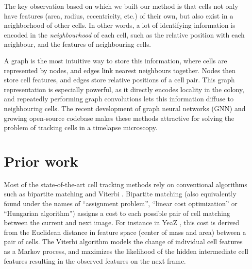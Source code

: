 \documentclass[10pt,conference,compsocconf,a4paper]{IEEEtran}
\begin{document}
	The key observation based on which we built our method is that cells not only have features (area, radius, eccentricity, etc.) of their own, but also exist in a neighborhood of other cells. In other words, a lot of identifying information is encoded in the \textit{neighbourhood} of each cell, such as the relative position with each neighbour, and the features of neighbouring cells.


	A graph is the most intuitive way to store this information, where cells are represented by nodes, and edges link nearest neighbours together. Nodes then store cell features, and edges store relative positions of a cell pair. This graph representation is especially powerful, as it directly encodes locality in the colony, and repeatedly performing graph convolutions lets this information diffuse to neighbouring cells.
	The recent development of graph neural networks (GNN) \cite{zhou_graph_2021} and growing open-source codebase \cite{paszke_pytorch_2019, fey_fast_2019} makes these methods attractive for solving the problem of tracking cells in a timelapse microscopy.

\section{Prior work}
	
	Most of the state-of-the-art cell tracking methods rely on conventional algorithms such as bipartite matching \cite{bipartite, dietler_convolutional_2020} and Viterbi \cite{viterbi, viterbi2}. Bipartite matching (also equivalently found under the names of ``assignment problem'', ``linear cost optimization'' or ``Hungarian algorithm'') assigns a cost to each possible pair of cell matching between the current and next image. For instance in YeaZ \cite{dietler_convolutional_2020}, this cost is derived from the Euclidean distance in feature space (center of mass and area) between a pair of cells. The Viterbi algorithm models the change of individual cell features as a Markov process, and maximizes the likelihood of the hidden intermediate cell features resulting in the observed features on the next frame.
	
\end{document}
